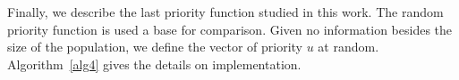 Finally, we describe the last priority function studied in this work. The random priority function is used a base for comparison. Given no information besides the size of the population, we define the vector of priority $u$ at random. Algorithm~\ref{alg4} gives the details on implementation. 
%
%
%
%
% 
%




